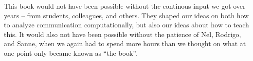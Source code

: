 \begin{preface}
This book would not have been possible without the continous input we got over years -- from students, colleagues, and others.
They shaped our ideas on both how to analyze communication computationally, but also our ideas about how to teach this. It
would also not have been possible without the patience of Nel, Rodrigo, and Sanne, when we again had to spend more hours than
we thought on what at one point only became known as ``the book''.

\end{preface}


\acknowledgments






